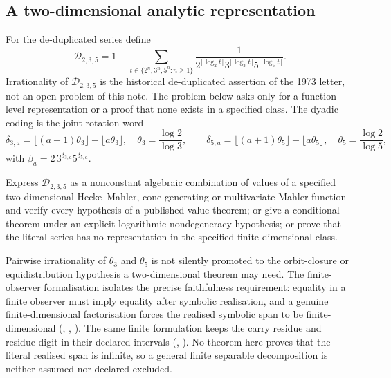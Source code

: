 
\subsection{A two-dimensional analytic representation}

For the de-duplicated series define
\[
 \mathcal D_{2,3,5}=1+
 \sum_{t\in\{2^n,3^n,5^n:n\ge1\}}
 \frac{1}{
   2^{\lfloor\log_2t\rfloor}
   3^{\lfloor\log_3t\rfloor}
   5^{\lfloor\log_5t\rfloor}}.
\]
Irrationality of $\mathcal D_{2,3,5}$ is the historical de-duplicated
assertion of the 1973 letter, not an open problem of this note.  The problem
below asks only for a function-level representation or a proof that none
exists in a specified class.
The dyadic coding is the joint rotation word
\[
 \delta_{3,a}=\lfloor(a+1)\theta_3\rfloor-\lfloor a\theta_3\rfloor,
 \quad \theta_3=\frac{\log2}{\log3},\qquad
 \delta_{5,a}=\lfloor(a+1)\theta_5\rfloor-\lfloor a\theta_5\rfloor,
 \quad \theta_5=\frac{\log2}{\log5},
\]
with $\beta_a=2\,3^{\delta_{3,a}}5^{\delta_{5,a}}$.

\begin{problem}
Express $\mathcal D_{2,3,5}$ as a nonconstant algebraic combination of values
of a specified two-dimensional Hecke--Mahler, cone-generating or multivariate
Mahler function and verify every hypothesis of a published value theorem; or
give a conditional theorem under an explicit logarithmic nondegeneracy
hypothesis; or prove that the literal series has no representation in the
specified finite-dimensional class.
\end{problem}

Pairwise irrationality of $\theta_3$ and $\theta_5$ is not silently promoted
to the orbit-closure or equidistribution hypothesis a two-dimensional theorem
may need.  The finite-observer formalisation isolates the precise
faithfulness requirement: equality in a finite observer must imply equality
after symbolic realisation, and a genuine finite-dimensional factorisation
forces the realised symbolic span to be finite-dimensional
(,
,
).
The same finite formulation keeps the carry residue and residue digit in their
declared intervals
(,
).
No theorem here proves that the literal realised span is infinite, so a
general finite separable decomposition is neither assumed nor declared
excluded.

